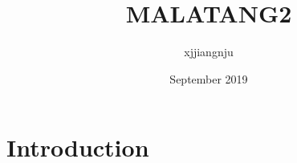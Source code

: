 \documentclass{article}
\title{MALATANG2}
\author{xjjiangnju }
\date{September 2019}
\begin{document}
\maketitle

\section{Introduction}
\end{document}
